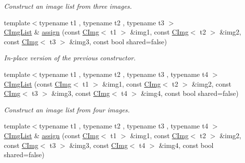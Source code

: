 \begin{DoxyCompactItemize}
\begin{DoxyCompactList}\small\item\em Construct an image list from three images. \item\end{DoxyCompactList}\item 
\hypertarget{structcimg__library_1_1_c_img_list_a6b5f18c8eef5b7124ed232368fd7f9f1}{
{\footnotesize template$<$typename t1 , typename t2 , typename t3 $>$ }\\\hyperlink{structcimg__library_1_1_c_img_list}{CImgList} \& \hyperlink{structcimg__library_1_1_c_img_list_a6b5f18c8eef5b7124ed232368fd7f9f1}{assign} (const \hyperlink{structcimg__library_1_1_c_img}{CImg}$<$ t1 $>$ \&img1, const \hyperlink{structcimg__library_1_1_c_img}{CImg}$<$ t2 $>$ \&img2, const \hyperlink{structcimg__library_1_1_c_img}{CImg}$<$ t3 $>$ \&img3, const bool shared=false)}
\label{structcimg__library_1_1_c_img_list_a6b5f18c8eef5b7124ed232368fd7f9f1}

\begin{DoxyCompactList}\small\item\em In-\/place version of the previous constructor. \item\end{DoxyCompactList}\item 
\hypertarget{structcimg__library_1_1_c_img_list_ac23ad2db00d1b257e354f9fcf33714a6}{
{\footnotesize template$<$typename t1 , typename t2 , typename t3 , typename t4 $>$ }\\\hyperlink{structcimg__library_1_1_c_img_list_ac23ad2db00d1b257e354f9fcf33714a6}{CImgList} (const \hyperlink{structcimg__library_1_1_c_img}{CImg}$<$ t1 $>$ \&img1, const \hyperlink{structcimg__library_1_1_c_img}{CImg}$<$ t2 $>$ \&img2, const \hyperlink{structcimg__library_1_1_c_img}{CImg}$<$ t3 $>$ \&img3, const \hyperlink{structcimg__library_1_1_c_img}{CImg}$<$ t4 $>$ \&img4, const bool shared=false)}
\label{structcimg__library_1_1_c_img_list_ac23ad2db00d1b257e354f9fcf33714a6}

\begin{DoxyCompactList}\small\item\em Construct an image list from four images. \item\end{DoxyCompactList}\item 
\hypertarget{structcimg__library_1_1_c_img_list_a61f90e5685eefb5f17d48ca8015088d6}{
{\footnotesize template$<$typename t1 , typename t2 , typename t3 , typename t4 $>$ }\\\hyperlink{structcimg__library_1_1_c_img_list}{CImgList} \& \hyperlink{structcimg__library_1_1_c_img_list_a61f90e5685eefb5f17d48ca8015088d6}{assign} (const \hyperlink{structcimg__library_1_1_c_img}{CImg}$<$ t1 $>$ \&img1, const \hyperlink{structcimg__library_1_1_c_img}{CImg}$<$ t2 $>$ \&img2, const \hyperlink{structcimg__library_1_1_c_img}{CImg}$<$ t3 $>$ \&img3, const \hyperlink{structcimg__library_1_1_c_img}{CImg}$<$ t4 $>$ \&img4, const bool shared=false)}
\label{structcimg__library_1_1_c_img_list_a61f90e5685eefb5f17d48ca8015088d6}


\end{DoxyCompactItemize}
